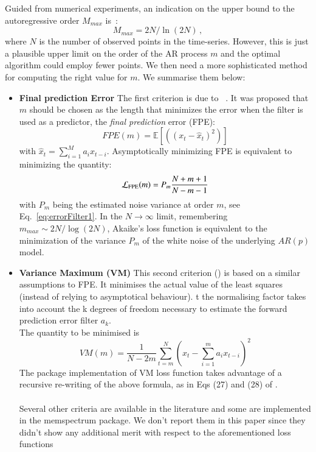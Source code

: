 \documentclass{aa}
\begin{document}
Guided from numerical experiments, an indication on the upper bound to the autoregressive order $M_{max}$ is~\citep{doi:10.1190/1.1440902}:
\begin{equation}\label{eq:MMAx}
M_{max} = 2N / \ln{(2N)}\,,
\end{equation}
where $N$ is the number of observed points in the time-series.
However, this is just a plausible upper limit on the order of the AR process $m$ and the optimal algorithm could employ fewer points.
We then need a more sophisticated method for computing the right value for $m$.
We summarise them below:

\begin{itemize}
\item \textbf{Final prediction Error} 
The first criterion is due to ~\citet{Akaike1970StatisticalPI}. It was proposed that $m$ should be chosen as the 
length that minimizes the error when the filter is used as a predictor, the \emph{final prediction} error (FPE): 
\begin{equation}
    FPE(m) = \mathbb{E}\left[ \left((x_t - \hat x_t) ^ 2\right) \right]
\end{equation}
with $\hat{x}_t = \sum_{i = 1}^M a_i x_{t - i}$.
Asymptotically minimizing FPE is equivalent to minimizing the quantity: 
\begin{equation}
    \mathcal{L}_{\rm FPE}(m) = P_{m} \frac{N + m + 1}{N - m - 1}
\end{equation}
with $P_m$ being the estimated noise variance at order $m$, see Eq.~\eqref{eq:errorFilter1}. In the $N \to \infty$ limit, 
remembering $m_{max} \sim 2N / \log(2N)$, Akaike's loss function is equivalent to the minimization of the variance $P_m$ of the white noise of the underlying $AR(p)$ model. 

\item \textbf{Variance Maximum (VM)}
This second criterion (\cite{kay1988modern}) is based on a similar assumptions to FPE. It minimises the actual value of the least squares (instead of relying to asymptotical behaviour). t the normalising factor takes into account the k degrees of freedom necessary to estimate the forward prediction error filter $a_k$.\\ The quantity to be minimised is
\begin{equation}
VM(m) = \frac{1}{N - 2m}\sum_{t=m}^N\left(x_t - \sum_{i=1}^m a_i x_{t-i} \right)^{2}
\end{equation}
The package implementation of VM loss function takes advantage of a recursive re-writing of the above formula, as in Eqs (27) and (28) of \citet{Cuoco_2001}.  \\ \\

Several other criteria are available in the literature \citet{doi:10.1029/WR018i004p01097} \citet{bhansali1986} and some are implemented in the memspectrum package. We don't report them in this paper since they didn't show any additional merit with respect to the aforementioned loss functions \\
\end{itemize}
\end{document}
